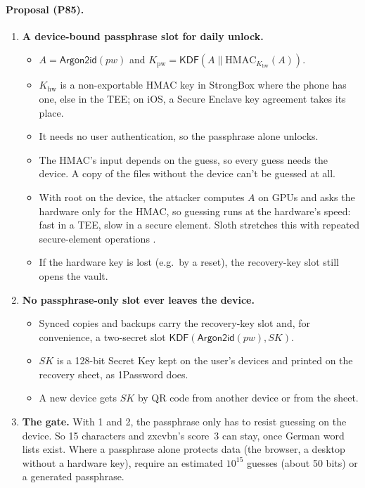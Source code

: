 \documentclass[11pt,a4paper]{article}
\newcommand{\concat}{\mathbin{\|}}
\newcommand{\KDF}{\mathsf{KDF}}
\newcommand{\Argon}{\mathsf{Argon2id}}
\newcommand{\dref}[1]{\textsf{#1}} %
\begin{document}
\paragraph{Proposal (\dref{P85}).}
\begin{enumerate}
  \item \textbf{A device-bound passphrase slot for daily unlock.}
  \begin{itemize}
    \item $A = \Argon(\mathit{pw})$ and $K_{\mathrm{pw}} = \KDF(A \concat \mathrm{HMAC}_{K_{\mathrm{hw}}}(A))$.
    \item $K_{\mathrm{hw}}$ is a non-exportable HMAC key in StrongBox where the phone has one, else in the TEE; on iOS, a Secure Enclave key agreement takes its place.
    \item It needs no user authentication, so the passphrase alone unlocks.
    \item The HMAC's input depends on the guess, so every guess needs the device. A copy of the files without the device can't be guessed at all.
    \item With root on the device, the attacker computes $A$ on GPUs and asks the hardware only for the HMAC, so guessing runs at the hardware's speed: fast in a TEE, slow in a secure element. Sloth stretches this with repeated secure-element operations \cite{sloth}.
    \item If the hardware key is lost (e.g.\ by a reset), the recovery-key slot still opens the vault.
  \end{itemize}
  \item \textbf{No passphrase-only slot ever leaves the device.}
  \begin{itemize}
    \item Synced copies and backups carry the recovery-key slot and, for convenience, a two-secret slot $\KDF(\Argon(\mathit{pw}), \mathit{SK})$.
    \item $\mathit{SK}$ is a 128-bit Secret Key kept on the user's devices and printed on the recovery sheet, as 1Password does.
    \item A new device gets $\mathit{SK}$ by QR code from another device or from the sheet.
  \end{itemize}
  \item \textbf{The gate.} With 1 and 2, the passphrase only has to resist guessing on the device. So 15 characters and zxcvbn's score~3 can stay, once German word lists exist. Where a passphrase alone protects data (the browser, a desktop without a hardware key), require an estimated $10^{15}$ guesses (about 50 bits) or a generated passphrase.

\end{enumerate}
\end{document}
